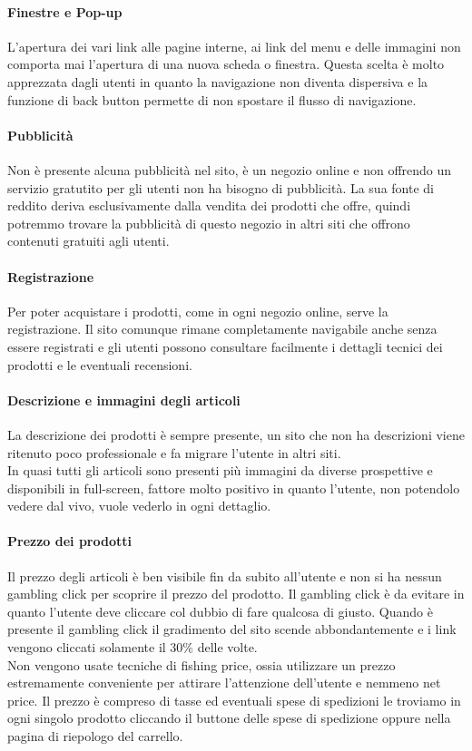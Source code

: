 \documentclass[12pt]{article}
\begin{document}
	\paragraph{Finestre e Pop-up} L'apertura dei vari link alle pagine interne, ai link del menu e delle immagini non comporta mai l'apertura di una nuova scheda o finestra. Questa scelta è molto apprezzata dagli utenti in quanto la navigazione non diventa dispersiva e la funzione di back button permette di non spostare il flusso di navigazione.
	\\
	\newpage
	\paragraph{Pubblicità} Non è presente alcuna pubblicità nel sito, è un negozio online e non offrendo un servizio gratutito per gli utenti non ha bisogno di pubblicità. La sua fonte di reddito deriva esclusivamente dalla vendita dei prodotti che offre, quindi potremmo trovare la pubblicità di questo negozio in altri siti che offrono contenuti gratuiti agli utenti. 
	\\
	\paragraph{Registrazione} Per poter acquistare i prodotti, come in ogni negozio online, serve la registrazione. Il sito comunque rimane completamente navigabile anche senza essere registrati e gli utenti possono consultare facilmente i dettagli tecnici dei prodotti e le eventuali recensioni.
	\\
	\paragraph{Descrizione e immagini degli articoli} La descrizione dei prodotti è sempre presente, un sito che non ha descrizioni viene ritenuto poco professionale e fa migrare l'utente in altri siti.\\
	In quasi tutti gli articoli sono presenti più immagini da diverse prospettive e disponibili in full-screen, fattore molto positivo in quanto l'utente, non potendolo vedere dal vivo, vuole vederlo in ogni dettaglio.
	\\    
	\paragraph{Prezzo dei prodotti} Il prezzo degli articoli è ben visibile fin da subito all'utente e non si ha nessun gambling click per scoprire il prezzo del prodotto. Il gambling click è da evitare in quanto l'utente deve cliccare col dubbio di fare qualcosa di giusto. Quando è presente il gambling click il gradimento del sito scende abbondantemente e i link vengono cliccati solamente il 30\% delle volte.
	\\ 	Non vengono usate tecniche di fishing price, ossia utilizzare un prezzo estremamente conveniente per attirare l'attenzione dell'utente e nemmeno net price. Il prezzo è compreso di tasse ed eventuali spese di spedizioni le troviamo in ogni singolo prodotto cliccando il buttone delle spese di spedizione oppure nella pagina di riepologo del carrello.
	\newpage
\end{document}
